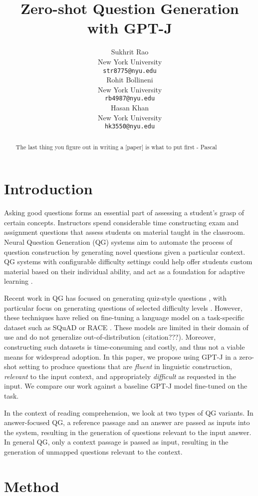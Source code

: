 \documentclass[11pt]{article}
\title{Zero-shot Question Generation with GPT-J}
\author{Sukhrit Rao \\
  New York University \\
  \texttt{str8775@nyu.edu} \\\And
  Rohit Bollineni \\
  New York University \\
  \texttt{rb4987@nyu.edu} \\\And
  Hasan Khan \\
  New York University \\
  \texttt{hk3550@nyu.edu} \\}
\begin{document}
\maketitle
\begin{abstract}
The last thing you figure out in writing a [paper] is what to put first - Pascal
\end{abstract}

\section{Introduction}

Asking good questions forms an essential part of assessing a student’s grasp of certain concepts. Instructors spend considerable time constructing exam and assignment questions that assess students on material taught in the classroom. Neural Question Generation (QG) systems aim to automate the process of question construction by generating novel questions given a particular context. QG systems with configurable difficulty settings could help offer students custom material based on their individual ability, and act as a foundation for adaptive learning \citep{adaptive-education:8}. 

Recent work in QG has focused on generating quiz-style questions \citep{Quiz:1}, with particular focus on generating questions of selected difficulty levels \citep{Difficulty:3}. However, these techniques have relied on fine-tuning a language model on a task-specific dataset such as SQuAD or RACE \citep{RACE:2}. These models are limited in their domain of use and do not generalize out-of-distribution (citation???). Moreover, constructing such datasets is time-consuming and costly, and thus not a viable means for widespread adoption. In this paper, we propose using GPT-J in a zero-shot setting to produce questions that are \textit{fluent} in linguistic construction, \textit{relevant} to the input context, and appropriately \textit{difficult} as requested in the input. We compare our work against a baseline GPT-J model fine-tuned on the task.

In the context of reading comprehension, we look at two types of QG variants. In answer-focused QG, a reference passage and an answer are passed as inputs into the system, resulting in the generation of questions relevant to the input answer. In general QG, only a context passage is passed as input, resulting in the generation of unmapped questions relevant to the context.

\section{Method}
\end{document}
